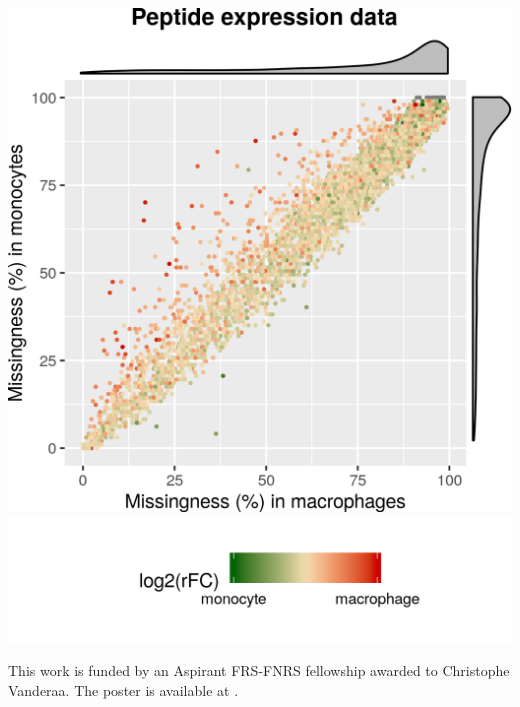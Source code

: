 \documentclass{article}
\begin{document}
\begin{multicols}{2}
\begin{minipage}[t]{0.45\linewidth}
\begin{center}
    \includegraphics[width=0.85\linewidth, trim={0 2cm 0 0}]{figs/missing.png} \\
    \vspace{0.5cm}
    \includegraphics[width=0.6\linewidth, trim={2cm 3cm 0cm 3.8cm},clip]{figs/missing-leg.png}
  \end{center}
  \vspace{0.4cm}
\end{minipage}


\noindent
This work is funded by an Aspirant FRS-FNRS fellowship awarded to Christophe Vanderaa. The poster is available at {\color{blue}{https://github.com/cvanderaa/ABLS2020-Poster}}.

\scriptsize
 


\end{multicols}
\end{document}
